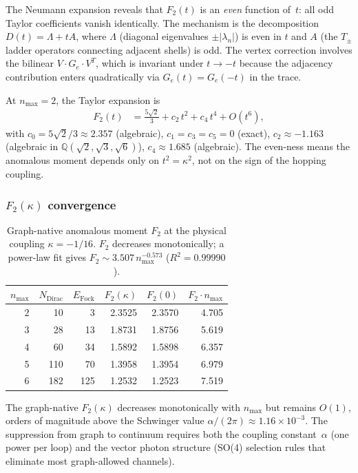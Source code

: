 \documentclass[11pt]{article}
\begin{document}
The Neumann expansion reveals that $F_2(t)$ is an \emph{even} function
of~$t$: all odd Taylor coefficients vanish identically.  The mechanism
is the decomposition $D(t) = \Lambda + tA$, where $\Lambda$ (diagonal
eigenvalues $\pm|\lambda_n|$) is even in $t$ and $A$ (the $T_{\pm}$
ladder operators connecting adjacent shells) is odd.  The vertex
correction involves the bilinear $V \cdot G_e \cdot V^T$, which is
invariant under $t \to -t$ because the adjacency contribution enters
quadratically via $G_e(t) = G_e(-t)$ in the trace.

At $n_{\max} = 2$, the Taylor expansion is
\begin{align}
  F_2(t) &= \frac{5\sqrt{2}}{3} + c_2\, t^2 + c_4\, t^4 + O(t^6),
  \label{eq:f2_taylor}
\end{align}
with $c_0 = 5\sqrt{2}/3 \approx 2.357$ (algebraic), $c_1 = c_3 = c_5
= 0$ (exact), $c_2 \approx -1.163$ (algebraic in $\mathbb{Q}(\sqrt{2},
\sqrt{3}, \sqrt{6})$), $c_4 \approx 1.685$ (algebraic).  The
even-ness means the anomalous moment depends only on $t^2 = \kappa^2$,
not on the sign of the hopping coupling.

\subsubsection{$F_2(\kappa)$ convergence}
\label{sec:f2_convergence}

\begin{table}[h]
\centering
\begin{tabular}{rrrrrr}
\hline
$n_{\max}$ & $N_{\mathrm{Dirac}}$ & $E_{\mathrm{Fock}}$ & $F_2(\kappa)$ & $F_2(0)$ & $F_2 \cdot n_{\max}$ \\
\hline
2 & 10 & 3 & 2.3525 & 2.3570 & 4.705 \\
3 & 28 & 13 & 1.8731 & 1.8756 & 5.619 \\
4 & 60 & 34 & 1.5892 & 1.5898 & 6.357 \\
5 & 110 & 70 & 1.3958 & 1.3954 & 6.979 \\
6 & 182 & 125 & 1.2532 & 1.2523 & 7.519 \\
\hline
\end{tabular}
\caption{Graph-native anomalous moment $F_2$ at the physical coupling
$\kappa = -1/16$.  $F_2$ decreases monotonically; a power-law fit gives
$F_2 \sim 3.507\, n_{\max}^{-0.573}$ ($R^2 = 0.99990$).}
\label{tab:f2_convergence}
\end{table}

The graph-native $F_2(\kappa)$ decreases monotonically with $n_{\max}$
but remains $O(1)$, orders of magnitude above the Schwinger value
$\alpha/(2\pi) \approx 1.16 \times 10^{-3}$.  The suppression from
graph to continuum requires both the coupling constant~$\alpha$ (one
power per loop) and the vector photon structure (SO(4) selection rules
that eliminate most graph-allowed channels).
\end{document}

